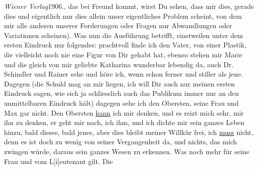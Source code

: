 \begin{ledgroupsized}[t]{13cm}
{{{                        \emph{Wiener Verlag}1906.}}}\label{K_L01548_3h}, das bei Freund kommt, wirst
                  \label{LL294-2v}Du sehen, dass mir dies, gerade dies und
                  eigentlich nur dies allein unser eigentliches Problem scheint, von dem mir alle
                  anderen unserer Forderungen oder Fragen nur Abwandlungen oder Variationen
                  scheinen\label{LL294-2h}). Was nun die Ausführung betrifft, einstweilen unter {\pb}dem ersten Eindruck nur folgendes: prachtvoll finde ich den Vater, von einer
               Plastik, die vielleicht noch nie eine Figur von Dir gehabt hat, ebenso stehen mir
               Marie und die gleich von mir geliebte Katharina wunderbar lebendig da, auch Dr.
               Schindler und Rainer sehe und höre ich, wenn schon ferner und stiller als jene.
               Dagegen (die Schuld mag an mir liegen, ich will Dir auch nur meinen ersten Eindruck
               sagen, wie sich ja schliesslich auch das Publikum immer nur an den unmittelbaren
               Eindruck hält) dagegen sehe ich den Obersten, seine Frau und Max gar nicht. Den Obersten \uline{kann} ich mir
               denken, und es reizt mich sehr, mir ihn zu denken, er geht mir nach, ich ihm, und ich
               dichte mir sein ganzes Leben hinzu, bald dieses, bald jenes, aber dies bleibt meiner
               Willkür frei, ich \uline{muss} nicht, denn es ist doch zu
               wenig von seiner Vergangenheit da, und nichts, das mich zwingen würde, daraus sein
               ganzes Wesen zu erkennen. Was noch mehr für seine Frau und vom L{[}i{]}eutenant gilt. Die

\end{ledgroupsized}
